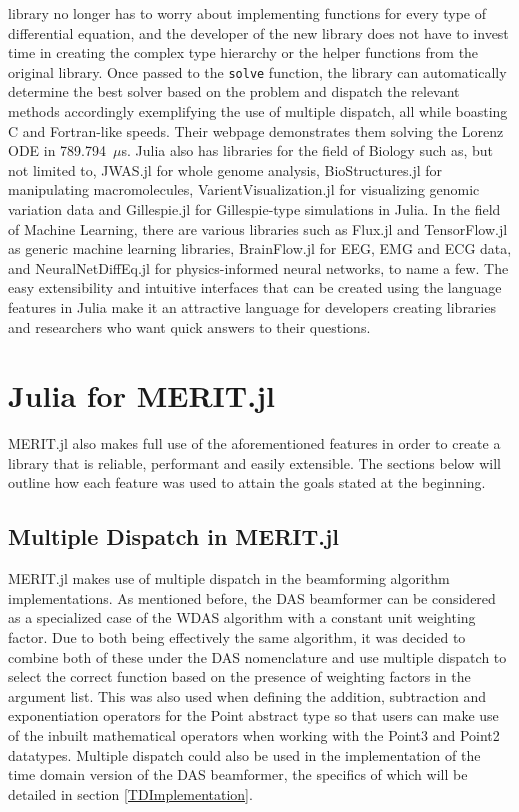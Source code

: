 library no longer has to worry about implementing functions for every type of differential equation, and the developer
of the new library does not have to invest time in creating the complex type hierarchy or the helper functions from the
original library. Once passed to the \lstinline[language=Julia]{solve} function, the library can automatically determine
the best solver based on the problem and dispatch the relevant methods accordingly exemplifying the use of multiple
dispatch, all while boasting C and Fortran-like speeds. Their webpage demonstrates them solving the Lorenz ODE in
789.794~$\mu$s. Julia also has libraries for the field of Biology such as, but not limited to, JWAS.jl for whole genome
analysis, BioStructures.jl for manipulating macromolecules, VarientVisualization.jl for visualizing genomic variation
data and Gillespie.jl for Gillespie-type simulations in Julia. In the field of Machine Learning, there are various
libraries such as Flux.jl and TensorFlow.jl as generic machine learning libraries, BrainFlow.jl for EEG, EMG and ECG
data, and NeuralNetDiffEq.jl for physics-informed neural networks, to name a few. The easy extensibility and intuitive
interfaces that can be created using the language features in Julia make it an attractive language for developers
creating libraries and researchers who want quick answers to their questions. 

\section{Julia for MERIT.jl}
MERIT.jl also makes full use of the aforementioned features in order to create a library that is reliable, performant
and easily extensible. The sections below will outline how each feature was used to attain the goals stated at the beginning.  

\subsection{Multiple Dispatch in MERIT.jl}
MERIT.jl makes use of multiple dispatch in the beamforming algorithm implementations. As mentioned before, the DAS
beamformer can be considered as a specialized case of the WDAS algorithm with a constant unit weighting factor. Due to
both being effectively the same algorithm, it was decided to combine both of these under the DAS nomenclature and use
multiple dispatch to select the correct function based on the presence of weighting factors in the argument list. This
was also used when defining the addition, subtraction and exponentiation operators for the Point abstract type so that
users can make use of the inbuilt mathematical operators when working with the Point3 and Point2 datatypes. Multiple
dispatch could also be used in the implementation of the time domain version of the DAS beamformer, the specifics of
which will be detailed in section \ref{TDImplementation}.  

